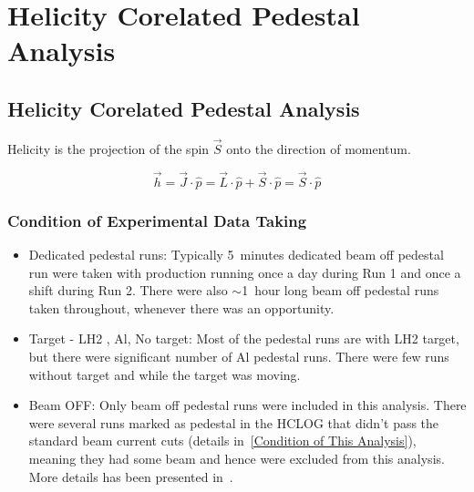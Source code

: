 \chapter{Helicity Corelated Pedestal Analysis}
\label{Helicity Corelated Pedestal Analysis 2}


\section{Helicity Corelated Pedestal Analysis}

Helicity is the projection of the spin $\vec{S}$ onto the direction of momentum.

\begin{equation} \label{equ:helicity1}
\vec{h} = \vec{J} \cdot \hat{p} = \vec{L} \cdot \hat{p} + \vec{S} \cdot \hat{p} = \vec{S} \cdot \hat{p} 
\end{equation}



\subsection{Condition of Experimental Data Taking}
\label{Condition of Experimental Data Taking}

\begin{itemize}
\item Dedicated pedestal runs: Typically 5~minutes dedicated beam off pedestal run were taken with production running once a day during Run 1 and once a shift during Run 2. There were also $\sim$1~hour long beam off pedestal runs taken throughout, whenever there was an opportunity.
\item Target - LH2 , Al, No target: Most of the pedestal runs are with LH2 target, but there were significant number of Al pedestal runs. There were few runs without target and while the target was moving.
\item Beam OFF: Only beam off pedestal runs were included in this analysis. There were several runs marked as pedestal in the HCLOG that didn't pass the standard beam current cuts (details in~\ref{Condition of This Analysis}), meaning they had some beam and hence were excluded from this analysis. More details has been presented in~\cite{presentation:nur_hel_cor_ped_talk1, presentation:nur_hel_cor_ped_talk2}.
\end{itemize}



